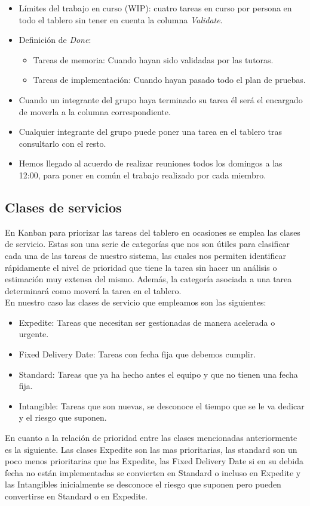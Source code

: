\begin{itemize}
    \item Límites del trabajo en curso (WIP): cuatro tareas en curso por persona en todo el tablero sin tener en cuenta la columna \textit{Validate}.
    \item Definición de \textit{Done}:
          \begin{itemize}
              \item Tareas de memoria: Cuando hayan sido validadas por las tutoras.
              \item Tareas de implementación: Cuando hayan pasado todo el plan de pruebas.
          \end{itemize}
    \item Cuando un integrante del grupo haya terminado su tarea él será el encargado de moverla a la columna correspondiente.
    \item Cualquier integrante del grupo puede poner una tarea en el tablero tras consultarlo con el resto.
    \item Hemos llegado al acuerdo de realizar reuniones todos los domingos a las 12:00, para poner en común el trabajo realizado por cada miembro.
\end{itemize}

\subsection{Clases de servicios}
\label{claseDeServicio}
En Kanban para priorizar las tareas del tablero en ocasiones se emplea las clases de servicio. Estas son una serie de categorías que nos son útiles para clasificar cada una de las tareas de nuestro sistema, las cuales nos permiten identificar rápidamente el nivel de prioridad que tiene la tarea sin hacer un análisis o estimación muy extensa del mismo. Además, la categoría asociada a una tarea determinará como moverá la tarea en el tablero.\\
En nuestro caso las clases de servicio que empleamos son las siguientes:
\begin{itemize}
    \item Expedite: Tareas que necesitan ser gestionadas de manera acelerada o urgente.
    \item Fixed Delivery Date: Tareas con fecha fija que debemos cumplir.
    \item Standard: Tareas que ya ha hecho antes el equipo y que no tienen una fecha fija.
    \item Intangible: Tareas que son nuevas, se desconoce el tiempo que se le va dedicar y el riesgo que suponen.
\end{itemize}
En cuanto a la relación de prioridad entre las clases mencionadas anteriormente es la siguiente. Las clases Expedite son las mas prioritarias, las standard son un poco menos prioritarias que las Expedite, las Fixed Delivery Date si en su debida fecha no están implementadas se convierten en Standard o incluso en Expedite y las Intangibles inicialmente se desconoce el riesgo que suponen pero pueden convertirse en Standard o en Expedite.

